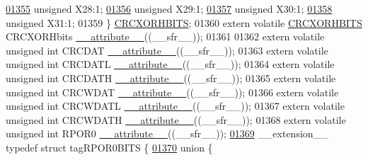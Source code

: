 \begin{DoxyCode}
\hypertarget{a00009_source_l01355}{}\hyperlink{a00008_a7870476992e5e2067067fc0be6954b53}{01355}   \textcolor{keywordtype}{unsigned} X28:1;
\hypertarget{a00009_source_l01356}{}\hyperlink{a00008_ab083e9ac9e3d68ece2a7648da71037ff}{01356}   \textcolor{keywordtype}{unsigned} X29:1;
\hypertarget{a00009_source_l01357}{}\hyperlink{a00008_a74cf3409511eae45282fd11004523974}{01357}   \textcolor{keywordtype}{unsigned} X30:1;
\hypertarget{a00009_source_l01358}{}\hyperlink{a00008_ab1dedfa9b394f7fa0afee647b393effe}{01358}   \textcolor{keywordtype}{unsigned} X31:1;
01359 \} \hyperlink{a00008_df/df1/a00357}{CRCXORHBITS};
01360 \textcolor{keyword}{extern} \textcolor{keyword}{volatile} \hyperlink{a00008_df/df1/a00357}{CRCXORHBITS} CRCXORHbits \hyperlink{a00009_a493c46f03454991ccc5aa7a6e1dfb2a7}{\_\_attribute\_\_}((\_\_sfr\_\_));
01361 
01362 \textcolor{keyword}{extern} \textcolor{keyword}{volatile} \textcolor{keywordtype}{unsigned} \textcolor{keywordtype}{int}  CRCDAT \hyperlink{a00009_a493c46f03454991ccc5aa7a6e1dfb2a7}{\_\_attribute\_\_}((\_\_sfr\_\_));
01363 \textcolor{keyword}{extern} \textcolor{keyword}{volatile} \textcolor{keywordtype}{unsigned} \textcolor{keywordtype}{int}  CRCDATL \hyperlink{a00009_a493c46f03454991ccc5aa7a6e1dfb2a7}{\_\_attribute\_\_}((\_\_sfr\_\_));
01364 \textcolor{keyword}{extern} \textcolor{keyword}{volatile} \textcolor{keywordtype}{unsigned} \textcolor{keywordtype}{int}  CRCDATH \hyperlink{a00009_a493c46f03454991ccc5aa7a6e1dfb2a7}{\_\_attribute\_\_}((\_\_sfr\_\_));
01365 \textcolor{keyword}{extern} \textcolor{keyword}{volatile} \textcolor{keywordtype}{unsigned} \textcolor{keywordtype}{int}  CRCWDAT \hyperlink{a00009_a493c46f03454991ccc5aa7a6e1dfb2a7}{\_\_attribute\_\_}((\_\_sfr\_\_));
01366 \textcolor{keyword}{extern} \textcolor{keyword}{volatile} \textcolor{keywordtype}{unsigned} \textcolor{keywordtype}{int}  CRCWDATL \hyperlink{a00009_a493c46f03454991ccc5aa7a6e1dfb2a7}{\_\_attribute\_\_}((\_\_sfr\_\_));
01367 \textcolor{keyword}{extern} \textcolor{keyword}{volatile} \textcolor{keywordtype}{unsigned} \textcolor{keywordtype}{int}  CRCWDATH \hyperlink{a00009_a493c46f03454991ccc5aa7a6e1dfb2a7}{\_\_attribute\_\_}((\_\_sfr\_\_));
01368 \textcolor{keyword}{extern} \textcolor{keyword}{volatile} \textcolor{keywordtype}{unsigned} \textcolor{keywordtype}{int}  RPOR0 \hyperlink{a00009_a493c46f03454991ccc5aa7a6e1dfb2a7}{\_\_attribute\_\_}((\_\_sfr\_\_));
\hypertarget{a00009_source_l01369}{}\hyperlink{a00008}{01369} \_\_extension\_\_ \textcolor{keyword}{typedef} \textcolor{keyword}{struct }tagRPOR0BITS \{
\hypertarget{a00009_source_l01370}{}\hyperlink{a00009}{01370}   \textcolor{keyword}{union }\{

\end{DoxyCode}
